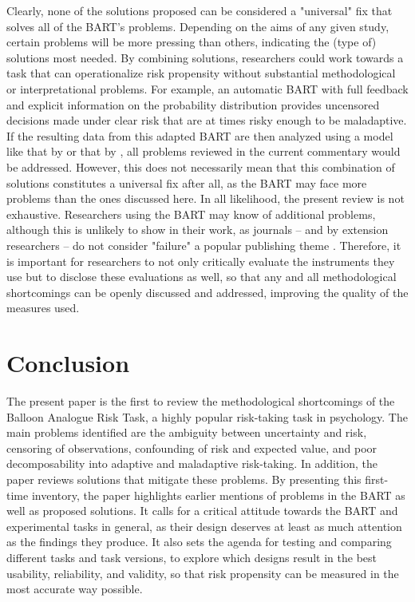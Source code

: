 \documentclass[serif, twocolumn, authordate, meta]{jote-article}
\begin{document}
Clearly, none of the solutions proposed can be considered a "universal" fix that solves all of the BART's problems. Depending on the aims of any given study, certain problems will be more pressing than others, indicating the (type of) solutions most needed. By combining solutions, researchers could work towards a task that can operationalize risk propensity without substantial methodological or interpretational problems. For example, an automatic BART with full feedback and explicit information on the probability distribution provides uncensored decisions made under clear risk that are at times risky enough to be maladaptive. If the resulting data from this adapted BART are then analyzed using a model like that by \textcite{Wallsten2005} or that by \textcite{vanRavenzwaaij2011}, all problems reviewed in the current commentary would be addressed. However, this does not necessarily mean that this combination of solutions constitutes a universal fix after all, as the BART may face more problems than the ones discussed here. In all likelihood, the present review is not exhaustive. Researchers using the BART may know of additional problems, although this is unlikely to show in their work, as journals -- and by extension researchers -- do not consider "failure" a popular publishing theme \parencite{Ferguson2012,Song2009}. Therefore, it is important for researchers to not only critically evaluate the instruments they use but to disclose these evaluations as well, so that any and all methodological shortcomings can be openly discussed and addressed, improving the quality of the measures used.

{}
\section*{Conclusion}
\label{sec:conclusion}

The present paper is the first to review the methodological shortcomings of the Balloon Analogue Risk Task, a highly popular risk-taking task in psychology. The main problems identified are the ambiguity between uncertainty and risk, censoring of observations, confounding of risk and expected value, and poor decomposability into adaptive and maladaptive risk-taking. In addition, the paper reviews solutions that mitigate these problems. By presenting this first-time inventory, the paper highlights earlier mentions of problems in the BART as well as proposed solutions. It calls for a critical attitude towards the BART and experimental tasks in general, as their design deserves at least as much attention as the findings they produce. It also sets the agenda for testing and comparing different tasks and task versions, to explore which designs result in the best usability, reliability, and validity, so that risk propensity can be measured in the most accurate way possible.
\end{document}
